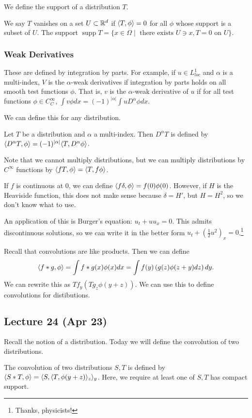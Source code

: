 \documentclass[10pt, twoside]{article}
\begin{document}
    We define the support of a distribution $T$.  \begin{defn} We say $T$
        vanishes on a set $U \subset \mathbb{R}^d$ if $\langle T,\phi\rangle = 0$ for all $\phi$
        whose support is a subset of $U$. The support $\operatorname{supp} T =
        \{x \in \Omega \mid \text{ there exists } U \ni x, T = 0 \text{ on } U
        \}$.  \end{defn}

    \subsubsection{Weak Derivatives} These are defined by integration by parts.
    For example, if $u \in L^1_{loc}$ and $\alpha$ is a multi-index, $V$ is the
    $\alpha$-weak derivatives if integration by parts holds on all smooth test
    functions $\phi$. That is, $v$ is the $\alpha$-weak derivative of $u$ if
    for all test functions $\phi \in C_C^{\infty}$, $\int v \phi dx =
    (-1)^{|\alpha|} \int u D^{\alpha} \phi dx$.

    We can define this for any distribution.  \begin{defn} Let
    $T$ be a distribution and $\alpha$ a multi-index. Then $D^{\alpha}T$ is
defined by $\langle D^{\alpha}T,\phi\rangle = (-1)^{\lvert\alpha\rvert} \langle T,D^{\alpha}
\phi\rangle$.  \end{defn}

    Note that we cannot multiply distributions, but we can multiply
    distributions by $C^{\infty}$ functions by $\langle fT,\phi\rangle = \langle T,f\phi\rangle$.

    \begin{exm} If $f$ is continuous at $0$, we can define $\langle f \delta,\phi\rangle
    = f(0) \phi(0)$. However, if $H$ is the Heaviside function, this does not
make sense because $\delta = H'$, but $H=H^2$, so we don't know what to use.
\end{exm}

    An application of this is Burger's equation: $u_t+uu_x=0$. This admits
    discontinuous solutions, so we can write it in the better form
    $u_t+\left(\frac{1}{2}u^2\right)_x=0$.\footnote{Thanks, physicists!}

    Recall that convolutions are like products. Then we can define
    \[\langle f*g,\phi\rangle = \int f*g(x) \phi(x) dx = \int f(y) \left( g(z) \phi(z+y)
    dz \right)dy.\] We can rewrite this as $Tf_y(Tg_z \phi(y+z))$. We can use
    this to define convolutions for distibutions.

    \subsection{Lecture 24 (Apr 23)} Recall the notion of a distribution. Today
    we will define the convolution of two distributions.
    \begin{defn} The convolution of two
        distributions $S,T$ is defined by $\langle S*T,\phi\rangle =
        \langle S,\langle T,\phi(y+z)\rangle_z\rangle_y$. Here, we require at least one of $S,T$
        has compact support.  \end{defn}
\end{document}

